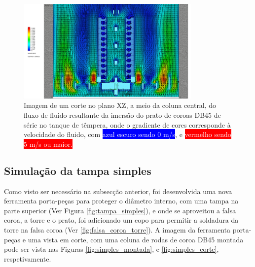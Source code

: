 \begin{figure}[htb]
    \centering
    \includegraphics[width = 0.8\textwidth]{Figures/Cap3/resultado_serie.png}
    \caption[Resultado da simulação CFD da têmpera das rodas de coroa de série]%
    {Imagem de um corte no plano XZ, a meio da coluna central, do fluxo de fluido resultante da imersão do prato de coroas DB45 de série no tanque de têmpera, onde o gradiente de cores corresponde à velocidade do fluido, com \colorbox{Blue}{\textcolor{White}{azul escuro sendo 0 m/s}}, e \colorbox{Red}{\textcolor{White}{vermelho sendo 5 m/s ou maior.}}}
    \label{fig:resultado_serie}
\end{figure}
\subsection{Simulação da tampa simples}  \label{ssec:materiais_concecao_simples}
Como visto ser necessário na subsecção anterior, foi desenvolvida uma nova ferramenta porta-peças para proteger o diâmetro interno, com uma tampa na parte superior (Ver Figura \ref{fig:tampa_simples}), e onde se aproveitou a falsa coroa, a torre e o prato, foi adicionado um copo para permitir a soldadura da torre na falsa coroa (Ver \ref{fig:falsa_coroa_torre}). A imagem da ferramenta porta-peças e uma vista em corte, com uma coluna de rodas de coroa DB45 montada pode ser vista nas Figuras \ref{fig:simples_montada}, e \ref{fig:simples_corte}, respetivamente.

